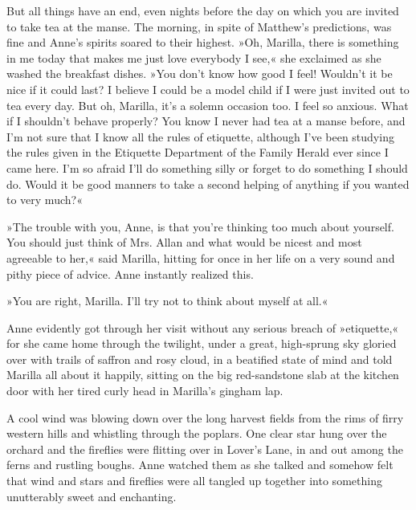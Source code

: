 But all things have an end, even nights before the day on which you are invited to take tea at the manse. The morning, in spite of Matthew’s predictions, was fine and Anne’s spirits soared to their highest. »Oh, Marilla, there is something in me today that makes me just love everybody I see,« she exclaimed as she washed the breakfast dishes. »You don’t know how good I feel! Wouldn’t it be nice if it could last? I believe I could be a model child if I were just invited out to tea every day. But oh, Marilla, it’s a solemn occasion too. I feel so anxious. What if I shouldn’t behave properly? You know I never had tea at a manse before, and I’m not sure that I know all the rules of etiquette, although I’ve been studying the rules given in the Etiquette Department of the Family Herald ever since I came here. I’m so afraid I’ll do something silly or forget to do something I should do. Would it be good manners to take a second helping of anything if you wanted to very much?«

»The trouble with you, Anne, is that you’re thinking too much about yourself. You should just think of Mrs. Allan and what would be nicest and most agreeable to her,« said Marilla, hitting for once in her life on a very sound and pithy piece of advice. Anne instantly realized this.

»You are right, Marilla. I’ll try not to think about myself at all.«

Anne evidently got through her visit without any serious breach of »etiquette,« for she came home through the twilight, under a great, high-sprung sky gloried over with trails of saffron and rosy cloud, in a beatified state of mind and told Marilla all about it happily, sitting on the big red-sandstone slab at the kitchen door with her tired curly head in Marilla’s gingham lap.

A cool wind was blowing down over the long harvest fields from the rims of firry western hills and whistling through the poplars. One clear star hung over the orchard and the fireflies were flitting over in Lover’s Lane, in and out among the ferns and rustling boughs. Anne watched them as she talked and somehow felt that wind and stars and fireflies were all tangled up together into something unutterably sweet and enchanting.

